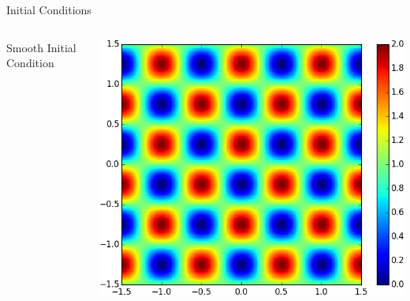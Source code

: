 \documentclass{beamer}
\begin{document}
\begin{frame}{Initial Conditions}
\begin{columns}
            \centering
            Smooth Initial Condition

            \includegraphics[width=\textwidth]{initcond_smooth.png}
        \end{columns}
    \end{frame}
\end{document}
